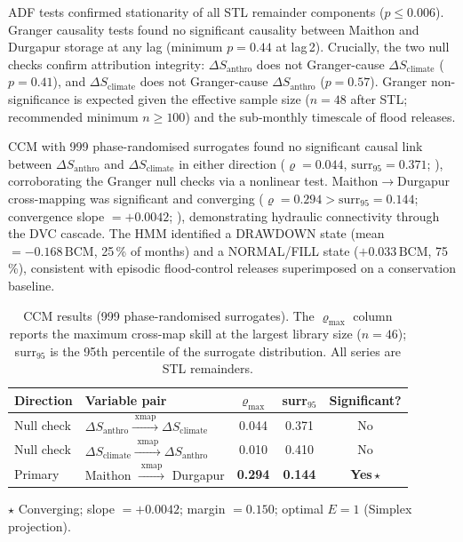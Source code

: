 \documentclass[preprint,12pt,authoryear]{elsarticle}
\newcommand{\dSclim}{\Delta S_{\mathrm{climate}}}
\newcommand{\dSanthro}{\Delta S_{\mathrm{anthro}}}
\newcommand{\BCM}{\,\mathrm{BCM}}
\newcommand{\xmap}{\xrightarrow{\;\mathrm{xmap}\;}}   %
\begin{document}
ADF tests confirmed stationarity of all STL remainder components
($p \leq 0.006$). Granger causality tests found no significant causality
between Maithon and Durgapur storage at any lag (minimum $p = 0.44$ at
lag\,2). Crucially, the two null checks confirm attribution integrity:
$\dSanthro$ does not Granger-cause $\dSclim$ ($p = 0.41$), and
$\dSclim$ does not Granger-cause $\dSanthro$ ($p = 0.57$). Granger
non-significance is expected given the effective sample size ($n = 48$
after STL; recommended minimum $n \geq 100$) and the sub-monthly timescale
of flood releases.

CCM with 999 phase-randomised surrogates found no significant causal link
between $\dSanthro$ and $\dSclim$ in either direction
($\varrho = 0.044$, $\text{surr}_{95} = 0.371$; ), corroborating
the Granger null checks via a nonlinear test. Maithon$\to$Durgapur
cross-mapping was significant and converging ($\varrho = 0.294 >
\text{surr}_{95} = 0.144$; convergence slope $= +0.0042$;
), demonstrating hydraulic connectivity through
the DVC cascade. The HMM identified a DRAWDOWN state (mean $= -0.168\BCM$,
25\,\% of months) and a NORMAL/FILL state ($+0.033\BCM$, 75\,\%), consistent
with episodic flood-control releases superimposed on a conservation baseline.

\begin{table}[htbp]
  \centering
  \caption{CCM results (999 phase-randomised surrogates). The $\varrho_{\max}$
           column reports the maximum cross-map skill at the largest library
           size ($n = 46$); surr$_{95}$ is the 95th percentile of the surrogate
           distribution. All series are STL remainders.}
  \label{tab:ccm}
  \begin{tabular}{llccc}
    \toprule
    Direction & Variable pair & $\varrho_{\max}$ & surr$_{95}$ & Significant? \\
    \midrule
    Null check & $\dSanthro \xmap \dSclim$  & 0.044 & 0.371 & No \\
    Null check & $\dSclim \xmap \dSanthro$  & 0.010 & 0.410 & No \\
    Primary    & Maithon $\xmap$ Durgapur   & \textbf{0.294} & \textbf{0.144} & \textbf{Yes}\,$\star$ \\
    \bottomrule
  \end{tabular}

  \smallskip

  {\footnotesize $\star$ Converging; slope $= +0.0042$;
  margin $= 0.150$; optimal $E = 1$ (Simplex projection).}
\end{table}
\end{document}
